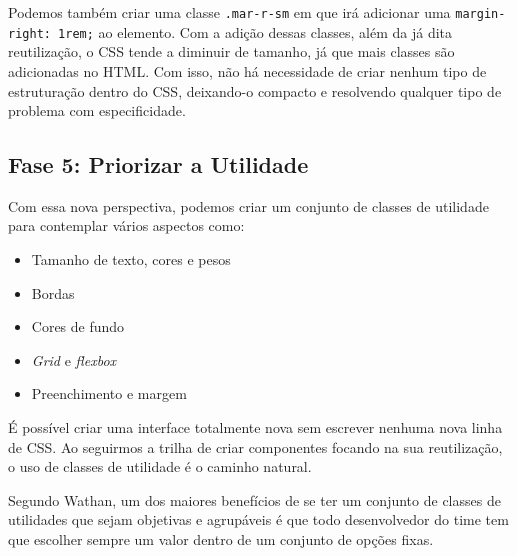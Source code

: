 Podemos também criar uma classe \texttt{.mar-r-sm} em que irá adicionar
uma \texttt{margin-right:\ 1rem;} ao elemento. Com a adição dessas
classes, além da já dita reutilização, o CSS tende a diminuir de
tamanho, já que mais classes são adicionadas no HTML. Com isso, não há
necessidade de criar nenhum tipo de estruturação dentro do CSS,
deixando-o compacto e resolvendo qualquer tipo de problema com
especificidade.

\hypertarget{fase-5-priorizar-a-utilidade}{%
\subsection{Fase 5: Priorizar a
Utilidade}\label{fase-5-priorizar-a-utilidade}}

Com essa nova perspectiva, podemos criar um conjunto de classes de
utilidade para contemplar vários aspectos como:

\begin{itemize}
\tightlist
\item
  Tamanho de texto, cores e pesos
\item
  Bordas
\item
  Cores de fundo
\item
  \emph{Grid} e \emph{flexbox}
\item
  Preenchimento e margem
\end{itemize}

\begin{Shaded}
\begin{Highlighting}[]
\KeywordTok{>}  
    \KeywordTok{>}  
        \KeywordTok{>} 
\end{Highlighting}
\end{Shaded}

É possível criar uma interface totalmente nova sem escrever nenhuma nova
linha de CSS. Ao seguirmos a trilha de criar componentes focando na sua
reutilização, o uso de classes de utilidade é o caminho natural.

Segundo Wathan, um dos maiores benefícios de se ter um conjunto de
classes de utilidades que sejam objetivas e agrupáveis é que todo
desenvolvedor do time tem que escolher sempre um valor dentro de um
conjunto de opções fixas.

